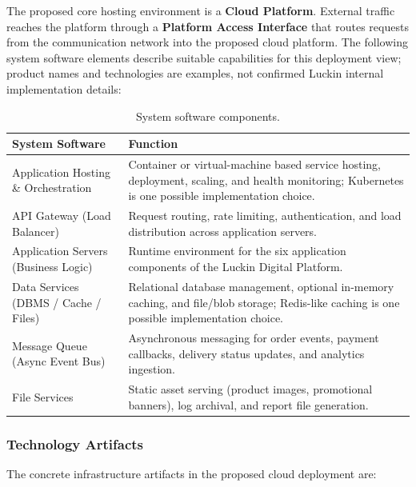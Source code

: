 \documentclass[12pt,a4paper]{article}
\begin{document}
The proposed core hosting environment is a \textbf{Cloud Platform}. External traffic reaches the platform through a \textbf{Platform Access Interface} that routes requests from the communication network into the proposed cloud platform. The following system software elements describe suitable capabilities for this deployment view; product names and technologies are examples, not confirmed Luckin internal implementation details:

\begin{table}[H]
\centering
\caption{System software components.}
\small
\begin{tabularx}{\textwidth}{P{3.8cm}Y}
\toprule
\textbf{System Software} & \textbf{Function} \\
\midrule
Application Hosting \& Orchestration & Container or virtual-machine based service hosting, deployment, scaling, and health monitoring; Kubernetes is one possible implementation choice. \\
API Gateway (Load Balancer) & Request routing, rate limiting, authentication, and load distribution across application servers. \\
Application Servers (Business Logic) & Runtime environment for the six application components of the Luckin Digital Platform. \\
Data Services (DBMS / Cache / Files) & Relational database management, optional in-memory caching, and file/blob storage; Redis-like caching is one possible implementation choice. \\
Message Queue (Async Event Bus) & Asynchronous messaging for order events, payment callbacks, delivery status updates, and analytics ingestion. \\
File Services & Static asset serving (product images, promotional banners), log archival, and report file generation. \\
\bottomrule
\end{tabularx}
\end{table}

\subsubsection{Technology Artifacts}

The concrete infrastructure artifacts in the proposed cloud deployment are:
\end{document}
